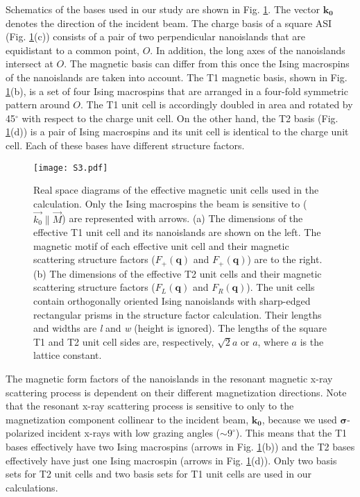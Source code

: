 \documentclass[aps, prb, reprint, showpacs, superscriptaddress]{revtex4-1}
\begin{document}
Schematics of the bases used in our study are shown in Fig. \ref{SFfig}.
The vector $\boldsymbol{k_0}$ denotes the direction of the incident beam.
The charge basis of a square ASI (Fig. \ref{SFfig}(c)) consists of a pair of two perpendicular nanoislands that are equidistant to a common point, $O$. 
In addition, the long axes of the nanoislands intersect at $O$.
The magnetic basis can differ from this once the Ising macrospins of the nanoislands are taken into account.
The T1 magnetic basis, shown in Fig. \ref{SFfig}(b), is a set of four Ising macrospins that are arranged in a four-fold symmetric pattern around $O$.
The T1 unit cell is accordingly doubled in area and rotated by 45$^{\circ}$ with respect to the charge unit cell.
On the other hand, the T2 basis (Fig. \ref{SFfig}(d)) is a pair of Ising macrospins and its unit cell is identical to the charge unit cell.
Each of these bases have different structure factors.
\begin{figure}[ht]
\begin{center}
\texttt{[image: S3.pdf]}
\caption {
Real space diagrams of the effective magnetic unit cells used in the calculation. 
Only the Ising macrospins the beam is sensitive to ($\vec{k_0}\parallel\vec{M}$) are represented with arrows. 
(a) The dimensions of the effective T1 unit cell and its nanoislands are shown on the left. 
The magnetic motif of each effective unit cell and their magnetic scattering structure factors ($F_+(\mathbf{q})$ and $F_+(\mathbf{q})$) are to the right. 
(b) The dimensions of the effective T2 unit cells and their magnetic scattering structure factors  ($F_L(\mathbf{q})$ and $F_R(\mathbf{q})$). 
The unit cells contain orthogonally oriented Ising nanoislands with sharp-edged rectangular prisms in the structure factor calculation. 
Their lengths and widths are \textit{l} and \textit{w} (height is ignored). 
The lengths of the square T1 and T2 unit cell sides are, respectively, $\sqrt{2}a$ or $a$, where $a$ is the lattice constant.
}  
\end{center}
\label{SFfig}
\end{figure}

The magnetic form factors of the nanoislands in the resonant magnetic x-ray scattering process is dependent on their different magnetization directions.
Note that the resonant x-ray scattering process is sensitive to only to the magnetization component collinear to the incident beam, $\boldsymbol{k_0}$, because we used $\boldsymbol{\sigma}$-polarized incident x-rays with low grazing angles ($\sim9^\circ$).\cite{Kortright}
This means that the T1 bases effectively have two Ising macrospins (arrows in Fig. \ref{SFfig}(b)) and the T2 bases effectively have just one Ising macrospin (arrows in Fig. \ref{SFfig}(d)).
Only two basis sets for T2 unit cells and two basis sets for T1 unit cells are used in our calculations.
\end{document}
